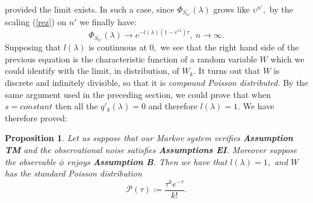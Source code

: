 \documentclass{article}
\newcommand{\1}{\mathbbm{1}}
\newtheorem{proposition}[theorem]{Proposition}
\begin{document}
provided the limit exists. In such a case, 
since $\Phi_{S_{n'}}(\lambda)$ grows like $\upsilon^{n'},$ by the scaling (\ref{rez})  on $n'$ we finally have:
$$
\Phi_{S_{n'}}(\lambda)\rightarrow e^{-l(\lambda)(1-e^{i\lambda})\tau}, \ n\rightarrow \infty.
$$
Supposing that $l(\lambda)$ is continuous at $0,$ we see that the right hand side of the previous equation is the characteristic function of a random variable $W$ which we could identify with the limit, in distribution, of $W_k.$ It turns out that $W$ is discrete and infinitely divisible, so that it is {\em compound Poisson distributed.} By the same argument used in the preceding section, we could prove that when $s=constant$   then   all the $q'_k(\lambda)=0$ and therefore 
 $l(\lambda)=1.$  We have therefore proved:
\begin{proposition}\label{pp2}
Let us suppose that our Markov system verifies {\bf Assumption TM} and the observational noise satisfies {\bf Assumptions EI}. Moreover suppose the observable $\phi$ enjoys {\bf Assumption B}. Then we  have that $l(\lambda)=1,$ and  $W$ has the standard Poisson distribution $$\mathcal{P}(\tau):=\frac{\tau^ke^{-\tau}}{k!}.$$ 
\end{proposition}
\end{document}
